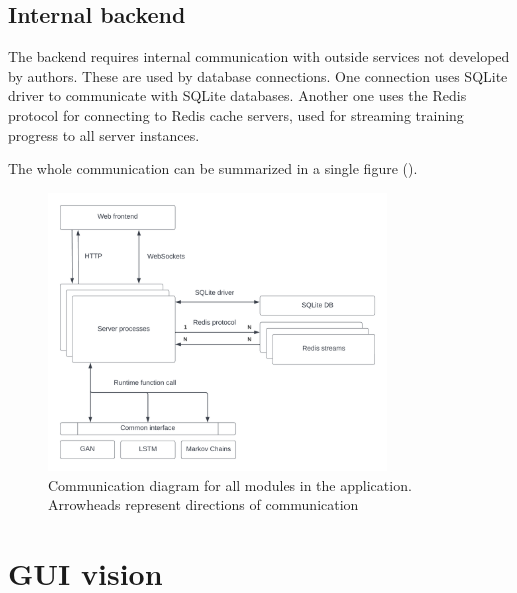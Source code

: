 \documentclass[a4paper, 11pt, twoside]{report}
\theoremstyle{definition}
\begin{document}
\subsection{Internal backend} \label{sec:comm_backend}

The backend requires internal communication with outside services not developed by authors. These are used by database connections. One connection uses SQLite driver to communicate with SQLite databases. Another one uses the Redis protocol for connecting to Redis cache servers, used for streaming training progress to all server instances. \par
The whole communication can be summarized in a single figure (). \par

\begin{figure}[H]
    \centering
    \includegraphics[width=0.8\textwidth]{assets/communication_diagram.png}
    \caption{Communication diagram for all modules in the application. Arrowheads represent directions of communication}
    \label{fig:communication_diagram}
\end{figure}

\section{GUI vision}
\end{document}
